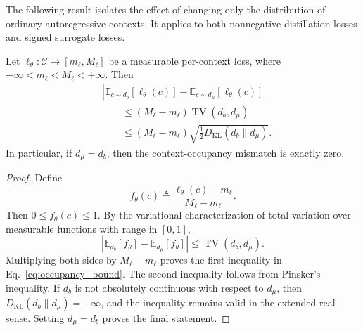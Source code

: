 \documentclass{llmxive}
\begin{document}
The following result isolates the effect of changing only the distribution
of ordinary autoregressive contexts. It applies to both nonnegative
distillation losses and signed surrogate losses.

\begin{proposition}
\label{prop:occupancy_matching}
Let
\(\ell_\theta:\mathcal C\rightarrow[m_\ell,M_\ell]\)
be a measurable per-context loss, where
\(-\infty<m_\ell<M_\ell<+\infty\). Then
\begin{equation}
\begin{aligned}
 &
 \left|
   \mathbb E_{c\sim d_b}
   \left[
     \ell_\theta(c)
   \right]
   -
   \mathbb E_{c\sim d_\mu}
   \left[
     \ell_\theta(c)
   \right]
 \right|
 \\
 &\qquad\le
 \left(
   M_\ell-m_\ell
 \right)
 \operatorname{TV}(d_b,d_\mu)
 \\
 &\qquad\le
 \left(
   M_\ell-m_\ell
 \right)
 \sqrt{
   \frac{1}{2}
   D_{\mathrm{KL}}(d_b\|d_\mu)
 }.
\end{aligned}
\label{eq:occupancy_bound}
\end{equation}
In particular, if \(d_\mu=d_b\), then the context-occupancy mismatch is
exactly zero.
\end{proposition}

\begin{proof}
Define
\begin{equation*}
 f_\theta(c)
 \triangleq
 \frac{
   \ell_\theta(c)-m_\ell
 }{
   M_\ell-m_\ell
 }.
\end{equation*}
Then \(0\le f_\theta(c)\le 1\). By the variational characterization of
total variation over measurable functions with range in \([0,1]\),
\begin{equation*}
 \left|
   \mathbb E_{d_b}[f_\theta]
   -
   \mathbb E_{d_\mu}[f_\theta]
 \right|
 \le
 \operatorname{TV}(d_b,d_\mu).
\end{equation*}
Multiplying both sides by \(M_\ell-m_\ell\) proves the first inequality in
Eq.~\ref{eq:occupancy_bound}. The second inequality follows from
Pinsker's inequality. If \(d_b\) is not absolutely continuous with respect
to \(d_\mu\), then
\(D_{\mathrm{KL}}(d_b\|d_\mu)=+\infty\), and the inequality remains valid
in the extended-real sense. Setting \(d_\mu=d_b\) proves the final
statement.
\end{proof}
\end{document}
